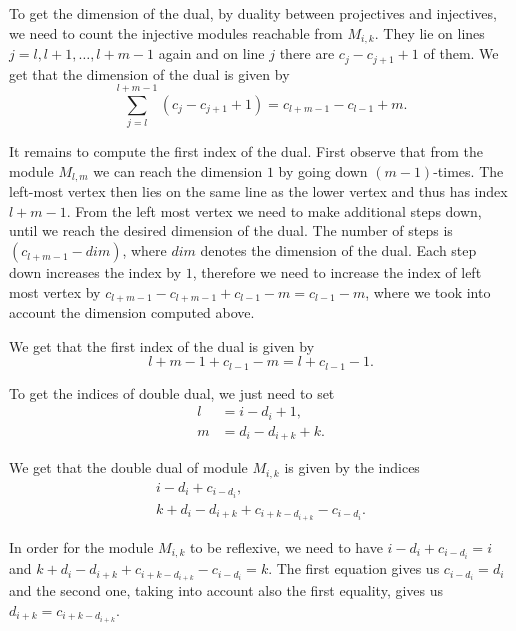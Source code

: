 \documentclass[12pt, a4paper]{article}
\begin{document}
To get the dimension of the dual, by duality between projectives and injectives, we need to count the injective modules reachable from $M_{i,k}$.
They lie on lines $j = l, l+1, \dots, l+m-1$ again and on line $j$ there are $c_j - c_{j+1} + 1$ of them.
We get that the dimension of the dual is given by
\begin{equation}
\label{eq:injectives}      
\sum_{j=l}^{l+m-1} (c_j - c_{j+1} + 1) = c_{l+m-1} - c_{l-1} + m.
\end{equation}

It remains to compute the first index of the dual.
First observe that from the module $M_{l,m}$ we can reach the dimension $1$ by going down $(m - 1)$-times. The left-most vertex then lies on the same line as the lower vertex and thus has index $l + m - 1$.
From the left most vertex we need to make additional steps down, until we reach the desired dimension of the dual.
The number of steps is $(c_{l+m-1} - dim)$, where $dim$ denotes the dimension of the dual.
Each step down increases the index by $1$, therefore we need to increase the index of left most vertex by $c_{l+m-1} - c_{l+m-1} + c_{l-1} - m = c_{l-1} - m$, where we took into account the dimension computed above.

We get that the first index of the dual is given by 
$$l + m - 1 + c_{l-1} - m = l + c_{l-1} - 1.$$

To get the indices of double dual, we just need to set 
\begin{align*}
    l &= i - d_i + 1, \\
    m &= d_i - d_{i+k} + k.
\end{align*}

We get that the double dual of module $M_{i,k}$ is given by the indices
\begin{align*}
    i - d_i + c_{i - d_i}, \\
    k + d_i - d_{i+k} + c_{i+k-{d_{i+k}}} - c_{i-d_i}.
\end{align*}

In order for the module $M_{i,k}$ to be reflexive, we need to have $i - d_i + c_{i - d_i} = i$ and $k + d_i - d_{i+k} + c_{i+k-{d_{i+k}}} - c_{i-d_i} = k$.
The first equation gives us $c_{i - d_i} = d_i$ and the second one, taking into account also the first equality, gives us $d_{i+k} = c_{i+k-{d_{i+k}}}$.



 

\end{document}
